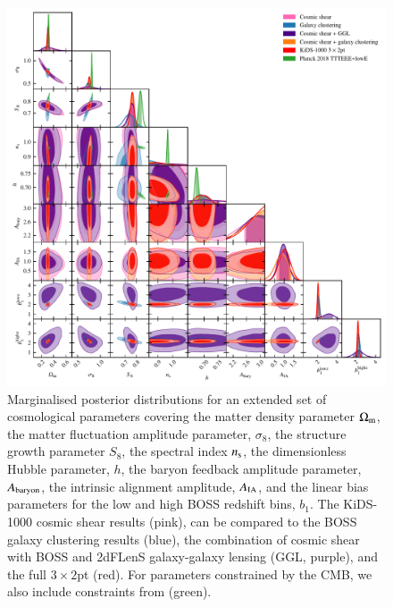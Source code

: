 \begin{figure}
	\begin{center}
		\includegraphics[width=\textwidth]{Parameter_Plots/cosmology/omegam_sigma8_s8_ns_h_a_baryon_a_ia_b1l_b1h_blind_C}
		\caption{Marginalised posterior distributions for an extended set of cosmological parameters covering the matter density parameter $\Omega_{\rm m}$, the matter fluctuation amplitude parameter, $\sigma_8$, the structure growth parameter $S_8$, the spectral index $n_{\rm s}$, the dimensionless Hubble parameter, $h$, the baryon feedback amplitude parameter, $A_{\rm baryon}$, the intrinsic alignment amplitude, $A_{\rm IA}$, and the linear bias parameters for the low and high BOSS redshift bins, $b_1$.   The KiDS-1000 cosmic shear results (pink), can be compared to the BOSS galaxy clustering results (blue), the combination of cosmic shear with BOSS and 2dFLenS galaxy-galaxy lensing (GGL, purple), and the full $3\times2$pt (red).   For parameters constrained by the CMB, we also include constraints from \citet{planck/etal:2018} (green).}
		\label{fig:cosmology-params-all}
	\end{center}
\end{figure}


